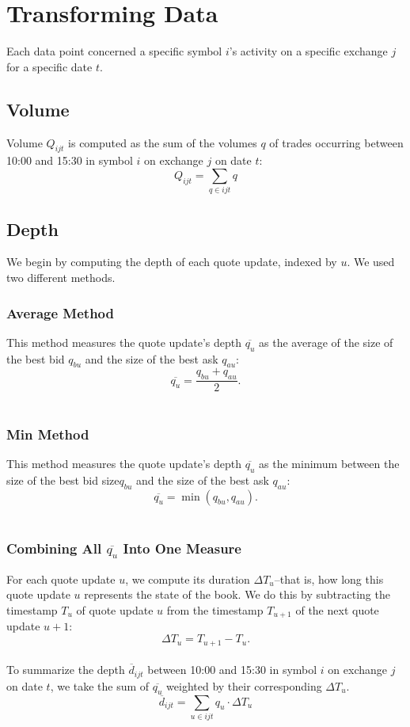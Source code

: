 \documentclass{article}
\begin{document}
\section{Transforming Data}
Each data point concerned a specific symbol $i$'s activity on a specific exchange $j$ for a specific date $t$.

\subsection{Volume}
Volume $Q_{ijt}$ is computed as the sum of the volumes $q$ of trades occurring between 10:00 and 15:30 in symbol $i$ on exchange $j$ on date $t$:\\
$$Q_{ijt} = \sum_{q \in ijt} q$$

\subsection{Depth}
We begin by computing the depth of each quote update, indexed by $u$. We used two different methods.

\subsubsection{Average Method}
This method measures the quote update's depth $\overline{q_u}$ as the average of the size of the best bid $q_{bu}$ and the size of the best ask $q_{au}$:\\
$$\overline{q_u} = \frac{q_{bu} + q_{au}}{2}.$$\\

\subsubsection{Min Method}
This method measures the quote update's depth $\overline{q_u}$ as the minimum between the size of the best bid size$q_{bu}$ and the size of the best ask $q_{au}$:\\
$$\overline{q_u} = \min({q_{bu}, q_{au}}).$$\\

\subsubsection{Combining All $\overline{q_u}$ Into One Measure}
For each quote update $u$, we compute its duration $\Delta T_u$--that is, how long this quote update $u$ represents the state of the book. We do this by subtracting the timestamp $T_u$ of quote update $u$ from the timestamp $T_{u+1}$ of the next quote update $u+1$:\\
$$\Delta T_u = T_{u+1} - T_u.$$\\
To summarize the depth $\overline{d}_{ijt}$ between 10:00 and 15:30 in symbol $i$ on exchange $j$ on date $t$, we take the sum of $\overline{q_u}$ weighted by their corresponding $\Delta T_u$.\\
$$\overline{d}_{ijt} = \sum_{u \in ijt} q_u \cdot\Delta T_u$$
\end{document}
